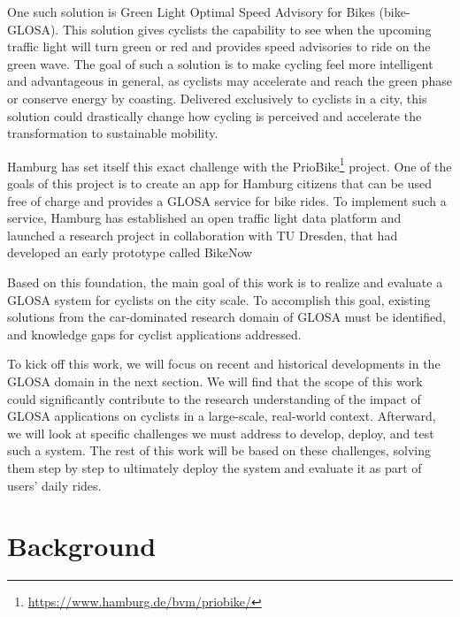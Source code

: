 One such solution is Green Light Optimal Speed Advisory for Bikes (bike-GLOSA). This solution gives cyclists the capability to see when the upcoming traffic light will turn green or red and provides speed advisories to ride on the green wave. The goal of such a solution is to make cycling feel more intelligent and advantageous in general, as cyclists may accelerate and reach the green phase or conserve energy by coasting. Delivered exclusively to cyclists in a city, this solution could drastically change how cycling is perceived and accelerate the transformation to sustainable mobility.

Hamburg has set itself this exact challenge with the PrioBike\footnote{\url{https://www.hamburg.de/bvm/priobike/}} project. One of the goals of this project is to create an app for Hamburg citizens that can be used free of charge and provides a GLOSA service for bike rides. To implement such a service, Hamburg has established an open traffic light data platform and launched a research project in collaboration with TU Dresden, that had developed an early prototype called BikeNow

Based on this foundation, the main goal of this work is to realize and evaluate a GLOSA system for cyclists on the city scale. To accomplish this goal, existing solutions from the car-dominated research domain of GLOSA must be identified, and knowledge gaps for cyclist applications addressed. 

To kick off this work, we will focus on recent and historical developments in the GLOSA domain in the next section. We will find that the scope of this work could significantly contribute to the research understanding of the impact of GLOSA applications on cyclists in a large-scale, real-world context. Afterward, we will look at specific challenges we must address to develop, deploy, and test such a system. The rest of this work will be based on these challenges, solving them step by step to ultimately deploy the system and evaluate it as part of users' daily rides.

\section{Background}

